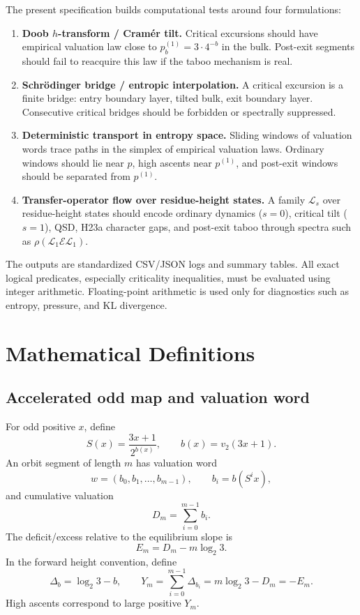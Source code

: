 \documentclass[11pt]{article}
\newcommand{\ord}{v_2}
\begin{document}
The present specification builds computational tests around four formulations:
\begin{enumerate}[label=\textbf{F\arabic*.},leftmargin=2.5em]
  \item \textbf{Doob $h$-transform / Cram\'er tilt.} Critical excursions should have empirical valuation law close to $p^{(1)}_b=3\cdot4^{-b}$ in the bulk. Post-exit segments should fail to reacquire this law if the taboo mechanism is real.
  \item \textbf{Schr\"odinger bridge / entropic interpolation.} A critical excursion is a finite bridge: entry boundary layer, tilted bulk, exit boundary layer. Consecutive critical bridges should be forbidden or spectrally suppressed.
  \item \textbf{Deterministic transport in entropy space.} Sliding windows of valuation words trace paths in the simplex of empirical valuation laws. Ordinary windows should lie near $p$, high ascents near $p^{(1)}$, and post-exit windows should be separated from $p^{(1)}$.
  \item \textbf{Transfer-operator flow over residue-height states.} A family $\mathcal L_s$ over residue-height states should encode ordinary dynamics ($s=0$), critical tilt ($s=1$), QSD, H23a character gaps, and post-exit taboo through spectra such as $\rho(\mathcal L_1\mathcal E\mathcal L_1)$.
\end{enumerate}

The outputs are standardized CSV/JSON logs and summary tables. All exact logical predicates, especially criticality inequalities, must be evaluated using integer arithmetic. Floating-point arithmetic is used only for diagnostics such as entropy, pressure, and KL divergence.

\section{Mathematical Definitions}

\subsection{Accelerated odd map and valuation word}

For odd positive $x$, define
\[
  S(x)=\frac{3x+1}{2^{b(x)}},\qquad b(x)=\ord(3x+1).
\]
An orbit segment of length $m$ has valuation word
\[
  w=(b_0,b_1,\ldots,b_{m-1}),
  \qquad b_i=b(S^i x),
\]
and cumulative valuation
\[
  D_m=\sum_{i=0}^{m-1}b_i.
\]
The deficit/excess relative to the equilibrium slope is
\[
  E_m=D_m-m\log_2 3.
\]
In the forward height convention, define
\[
  \Delta_b=\log_2 3-b,
  \qquad Y_m=\sum_{i=0}^{m-1}\Delta_{b_i}=m\log_2 3-D_m=-E_m.
\]
High ascents correspond to large positive $Y_m$.
\end{document}
